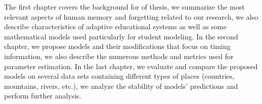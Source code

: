 The first chapter covers the background for of thesis, we summarize the most relevant aspects of human memory and forgetting related to our research, we also describe characteristics of adaptive educational systems as well as some mathematical models used particularly for student modeling. In the second chapter, we propose models and their modifications that focus on timing information, we also describe the numerous methods and metrics used for parameter estimation. In the last chapter, we evaluate and compare the proposed models on several data sets containing different types of places (countries, mountains, rivers, etc.), we analyze the stability of models' predictions and perform further analysis.
